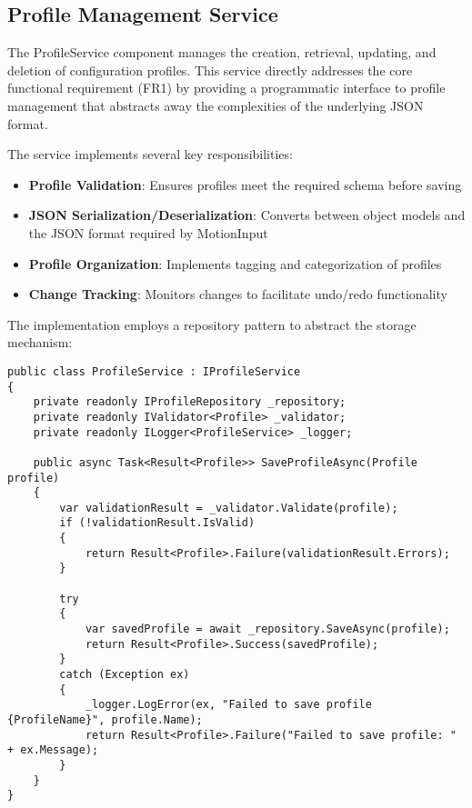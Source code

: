 \subsection{Profile Management Service}
The ProfileService component manages the creation, retrieval, updating, and deletion of configuration profiles. This service directly addresses the core functional requirement (FR1) by providing a programmatic interface to profile management that abstracts away the complexities of the underlying JSON format.

The service implements several key responsibilities:

\begin{itemize}
    \item \textbf{Profile Validation}: Ensures profiles meet the required schema before saving
    \item \textbf{JSON Serialization/Deserialization}: Converts between object models and the JSON format required by MotionInput
    \item \textbf{Profile Organization}: Implements tagging and categorization of profiles
    \item \textbf{Change Tracking}: Monitors changes to facilitate undo/redo functionality
\end{itemize}

The implementation employs a repository pattern to abstract the storage mechanism:

\begin{verbatim}
public class ProfileService : IProfileService
{
    private readonly IProfileRepository _repository;
    private readonly IValidator<Profile> _validator;
    private readonly ILogger<ProfileService> _logger;
    
    public async Task<Result<Profile>> SaveProfileAsync(Profile profile)
    {
        var validationResult = _validator.Validate(profile);
        if (!validationResult.IsValid)
        {
            return Result<Profile>.Failure(validationResult.Errors);
        }
        
        try
        {
            var savedProfile = await _repository.SaveAsync(profile);
            return Result<Profile>.Success(savedProfile);
        }
        catch (Exception ex)
        {
            _logger.LogError(ex, "Failed to save profile {ProfileName}", profile.Name);
            return Result<Profile>.Failure("Failed to save profile: " + ex.Message);
        }
    }
}
\end{verbatim}

